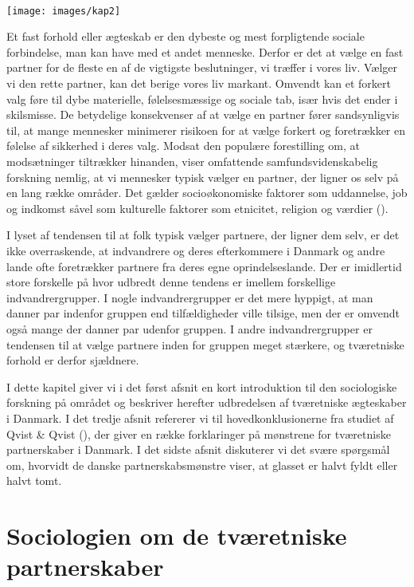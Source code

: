 \documentclass[
]{book}
\begin{document}
~~~~

\texttt{[image: images/kap2]}

\newpage

Et fast forhold eller ægteskab er den dybeste og mest forpligtende sociale forbindelse, man kan have med et andet menneske. Derfor er det at vælge en fast partner for de fleste en af de vigtigste beslutninger, vi træffer i vores liv. Vælger vi den rette partner, kan det berige vores liv markant. Omvendt kan et forkert valg føre til dybe materielle, følelsesmæssige og sociale tab, især hvis det ender i skilsmisse. De betydelige konsekvenser af at vælge en partner fører sandsynligvis til, at mange mennesker minimerer risikoen for at vælge forkert og foretrækker en følelse af sikkerhed i deres valg. Modsat den populære forestilling om, at modsætninger tiltrækker hinanden, viser omfattende samfundsvidenskabelig forskning nemlig, at vi mennesker typisk vælger en partner, der ligner os selv på en lang række områder. Det gælder socioøkonomiske faktorer som uddannelse, job og indkomst såvel som kulturelle faktorer som etnicitet, religion og værdier ().

I lyset af tendensen til at folk typisk vælger partnere, der ligner dem selv, er det ikke overraskende, at indvandrere og deres efterkommere i Danmark og andre lande ofte foretrækker partnere fra deres egne oprindelseslande. Der er imidlertid store forskelle på hvor udbredt denne tendens er imellem forskellige indvandrergrupper. I nogle indvandrergrupper er det mere hyppigt, at man danner par indenfor gruppen end tilfældigheder ville tilsige, men der er omvendt også mange der danner par udenfor gruppen. I andre indvandrergrupper er tendensen til at vælge partnere inden for gruppen meget stærkere, og tværetniske forhold er derfor sjældnere.

I dette kapitel giver vi i det først afsnit en kort introduktion til den sociologiske forskning på området og beskriver herefter udbredelsen af tværetniske ægteskaber i Danmark. I det tredje afsnit refererer vi til hovedkonklusionerne fra studiet af Qvist \& Qvist (), der giver en række forklaringer på mønstrene for tværetniske partnerskaber i Danmark. I det sidste afsnit diskuterer vi det svære spørgsmål om, hvorvidt de danske partnerskabsmønstre viser, at glasset er halvt fyldt eller halvt tomt.

\section{Sociologien om de tværetniske partnerskaber}\label{sociologien-om-de-tvuxe6retniske-partnerskaber}
\end{document}
